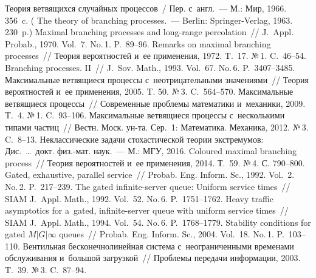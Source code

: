 \begin{multicols}{2}
{\small\frenchspacing
 {%
 \begin{thebibliography}{99}
 Теория вет\-вя\-щих\-ся случайных процессов~/ Пер. с~англ.~--- 
М.: Мир, 1966. 356~c.
( {The theory of branching processes.}~---
Berlin: Springer-Verlag, 1963. 230~p.)
 Maximal branching processes and long-range
per\-co\-la\-ti\-on~// J.~Appl. Probab., 1970. Vol.~7. No.\,1. P.~89--96.
 Remarks on maximal branching processes~// Теория
вероятностей и~ее применения, 1972. T.~17. №\,1. C.~46--54.
 Branching processes. II~// J.~Sov. Math., 1993. 
Vol.~67. No.\,6. P.~3407--3485.
 Максимальные вет\-вя\-щи\-еся процессы 
с~неотрицательными значениями~// Теория вероятностей и~ее применения,
2005. T. 50. №\,3. C.~564--570.
 Максимальные вет\-вя\-щи\-еся процессы~//
Современные проб\-ле\-мы математики и~механики, 2009. T.~4. №\,1. C.~93--106.
Максимальные вет\-вя\-щи\-еся процессы с~несколькими типами час\-тиц~// 
Вестн. Моск. ун-та. 
Сер.~1:
Математика. Механика, 2012. №\,3. C.~8--13.
  Неклассические задачи сто\-ха\-сти\-че\-ской тео\-рии 
экстремумов:
Дис.\ \ldots\ докт. физ.-мат. наук.~--- М.: МГУ, 2016.
Coloured maximal branching process~//
Теория вероятностей и~ее применения, 2014. Т.~59. №\,4. С. 790--800.
 Gated, exhaustive,
parallel service~// Probab. Eng. Inform. Sc., 1992. Vol.~2. No.\,2. P.~217--239.
 The gated
infinite-server queue: Uniform service times~// SIAM J.~Appl. Math.,
1992. Vol.~52. No.\,6. P.~1751--1762.
 Heavy traffic asymptotics for a~gated,
infinite-server queue with uniform service times~// SIAM J.~Appl. Math.,
1994. Vol.~54. No.\,6. P.~1768--1779.
 Stability conditions for gated
$M|G|\infty$ queues~// Probab. Eng. Inform. Sc., 2004. Vol.~18. No.\,1. P.~103--110.
 Вентильная бесконечнолинейная сис\-те\-ма с~неограниченными
временами обслу\-жи\-ва\-ния и~большой за\-груз\-кой~// Проб\-ле\-мы передачи информации,
2003. T.~39. №\,3. C.~87--94.

\end{thebibliography}}}
\end{multicols}
